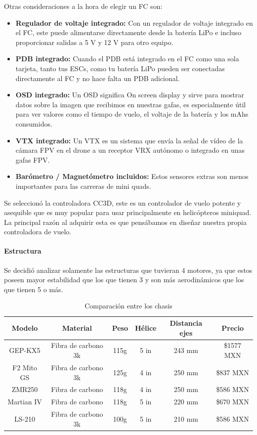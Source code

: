 \documentclass[pdflatex,sn-mathphys-num]{sn-jnl}%
\begin{document}
Otras consideraciones a la hora de elegir un FC son:

\begin{itemize}
    \item \textbf{Regulador de voltaje integrado:} Con un regulador de voltaje integrado en el FC, este puede alimentarse directamente desde la batería LiPo e incluso proporcionar salidas a 5 V y 12 V para otro equipo.
    \item \textbf{PDB integrado:} Cuando el PDB está integrado en el FC como una sola tarjeta, tanto tus ESCs, como tu batería LiPo pueden ser conectadas directamente al FC y no hace falta un PDB adicional.
    \item \textbf{OSD integrado:} Un OSD significa On screen display y sirve para mostrar datos sobre la imagen que recibimos en nuestras gafas, es especialmente útil para ver valores como el tiempo de vuelo, el voltaje de la batería y los mAhs consumidos.
    \item \textbf{VTX integrado:} Un VTX es un sistema que envía la señal de vídeo de la cámara FPV en el drone a un receptor VRX autónomo o integrado en unas gafas FPV.
    \item \textbf{Barómetro / Magnetómetro incluidos:} Estos sensores extras son menos importantes para las carreras de mini quads.
\end{itemize}

Se seleccionó la controladora CC3D, este es un controlador de vuelo potente y asequible que es muy popular para usar principalmente en helicópteros miniquad. La principal razón al adquirir esta es que pensábamos en diseñar nuestra propia controladora de vuelo.

\paragraph{Estructura}

Se decidió analizar solamente las estructuras que tuvieran 4 motores, ya que estos poseen mayor estabilidad que los que tienen 3 y son más aerodinámicos que los que tienen 5 o más.

\begin{table}[!h]
\centering
\caption{Comparación entre los chasis}
\label{tab:chassis_comparison}
\begin{tabular}{|c|c|c|c|c|c|}
\hline
\textbf{Modelo} & \textbf{Material} & \textbf{Peso} & \textbf{Hélice} & \textbf{Distancia ejes} & \textbf{Precio} \\
\hline
GEP-KX5 & Fibra de carbono 3k & 115g & 5 in & 243 mm & \$1577 MXN \\
\hline
F2 Mito GS & Fibra de carbono 3k & 125g & 4 in & 250 mm & \$837 MXN \\
\hline
ZMR250 & Fibra de carbono & 118g & 4 in & 250 mm & \$586 MXN \\
\hline
Martian IV & Fibra de carbono & 118g & 5 in & 220 mm & \$670 MXN \\
\hline
LS-210 & Fibra de carbono 3k & 100g & 5 in & 210 mm & \$586 MXN \\
\hline
\end{tabular}
\end{table}
\end{document}
